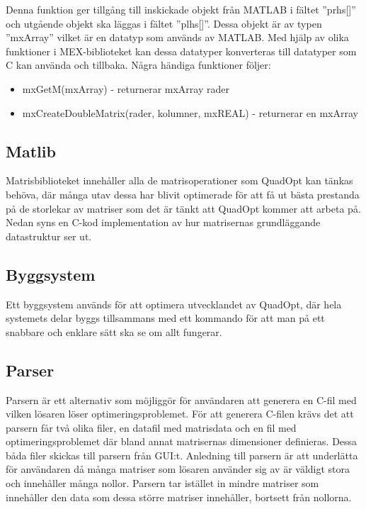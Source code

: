 Denna funktion ger tillgång till inskickade objekt från MATLAB i fältet ''prhs[]'' och utgående objekt ska läggas i fältet ''plhs[]''. Dessa objekt är av typen ''mxArray'' vilket är en datatyp som används av MATLAB. Med hjälp av olika funktioner i MEX-biblioteket kan dessa datatyper konverteras till datatyper som C kan använda och tillbaka. Några händiga funktioner följer:
\begin{itemize}
\item mxGetM(mxArray) - returnerar mxArray rader
\item mxCreateDoubleMatrix(rader, kolumner, mxREAL) - returnerar en mxArray
\end{itemize}



\subsection{Matlib}
Matrisbiblioteket innehåller alla de matrisoperationer som QuadOpt kan tänkas behöva, där många utav dessa har blivit optimerade för att få ut bästa prestanda på de storlekar av matriser som det är tänkt att QuadOpt kommer att arbeta på. Nedan syns en C-kod implementation av hur matrisernas grundläggande datastruktur ser ut. %


\subsection{Byggsystem}
Ett byggsystem används för att optimera utvecklandet av QuadOpt, där hela systemets delar byggs tillsammans med ett kommando för att man på ett snabbare och enklare sätt ska se om allt fungerar. %

\subsection{Parser}
Parsern är ett alternativ som möjliggör för användaren att generera en C-fil med vilken lösaren löser optimeringsproblemet. För att generera C-filen krävs det att parsern får två olika filer, en datafil med matrisdata och en fil med optimeringsproblemet där bland annat matrisernas dimensioner definieras. Dessa båda filer skickas till parsern från GUI:t. Anledning till parsern är att underlätta för användaren då många matriser som lösaren använder sig av är väldigt stora och innehåller många nollor. Parsern tar istället in mindre matriser som innehåller den data som dessa större matriser innehåller, bortsett från nollorna.